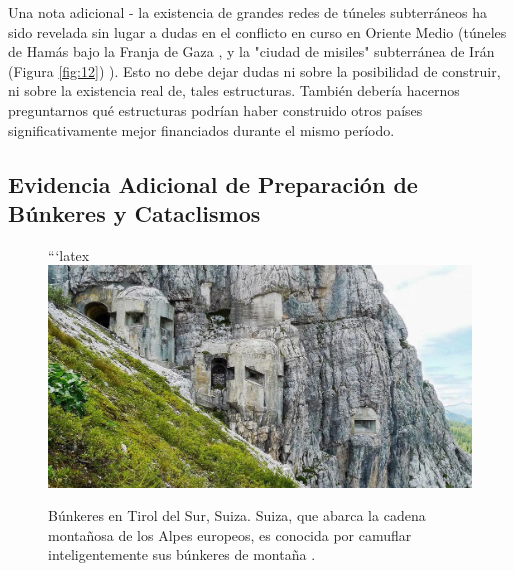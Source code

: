 \documentclass[10pt,twocolumn,letterpaper]{article}
\begin{document}
Una nota adicional - la existencia de grandes redes de túneles subterráneos ha sido revelada sin lugar a dudas en el conflicto en curso en Oriente Medio (túneles de Hamás bajo la Franja de Gaza \cite{38}, y la "ciudad de misiles" subterránea de Irán (Figura \ref{fig:12}) \cite{39,40}). Esto no debe dejar dudas ni sobre la posibilidad de construir, ni sobre la existencia real de, tales estructuras. También debería hacernos preguntarnos qué estructuras podrían haber construido otros países significativamente mejor financiados durante el mismo período.

\subsection{Evidencia Adicional de Preparación de Búnkeres y Cataclismos}

\begin{figure}[t]
\begin{center}
```latex
   \includegraphics[width=1\linewidth]{tyrol.jpg}
\end{center}
   \caption{Búnkeres en Tirol del Sur, Suiza. Suiza, que abarca la cadena montañosa de los Alpes europeos, es conocida por camuflar inteligentemente sus búnkeres de montaña \cite{32}.}
\label{fig:7}
\label{fig:onecol}
\end{figure}
\end{document}
